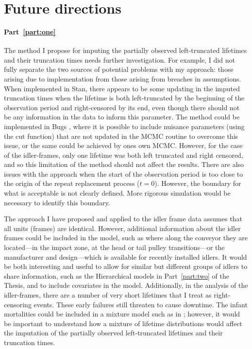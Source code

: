 \section{Future directions} \label{sec:Thesis-future-work}

\paragraph*{Part~\ref{part:one}} The method I propose for imputing the partially observed left-truncated lifetimes and their truncation times needs further investigation. For example, I did not fully separate the two sources of potential problems with my approach: those arising due to implementation from those arising from breaches in assumptions. When implemented in Stan, there appears to be some updating in the imputed truncation times when the lifetime is both left-truncated by the beginning of the observation period and right-censored by its end, even though there should not be any information in the data to inform this parameter. The method could be implemented in Bugs \citep{lunn2012}, where it is possible to include nuisance parameters (using the cut function) that are not updated in the MCMC routine to overcome this issue, or the same could be achieved by ones own MCMC. However, for the case of the idler-frames, only one lifetime was both left truncated and right censored, and so this limitation of the method should not affect the results. There are also issues with the approach when the start of the observation period is too close to the origin of the repeat replacement process ($t = 0$). However, the boundary for what is acceptable is not clearly defined. More rigorous simulation would be necessary to identify this boundary.

The approach I have proposed and applied to the idler frame data assumes that all units (frames) are identical. However, additional information about the idler frames could be included in the model, such as where along the conveyor they are located---in the impact zone, at the head or tail pulley transitions---or the manufacturer and design---which is available for recently installed idlers. It would be both interesting and useful to allow for similar but different groups of idlers to share information, such as the Hierarchical models in Part~\ref{part:two} of the Thesis, and to include covariates in the model. Additionally, in the analysis of the idler-frames, there are a number of very short lifetimes that I treat as right-censoring events. These early failures still threaten to cause downtime. The infant mortalities could be included in a mixture model such as in \citet{mittman2013}; however, it would be important to understand how a mixture of lifetime distributions would affect the imputation of the partially observed left-truncated lifetimes and their truncation times.

